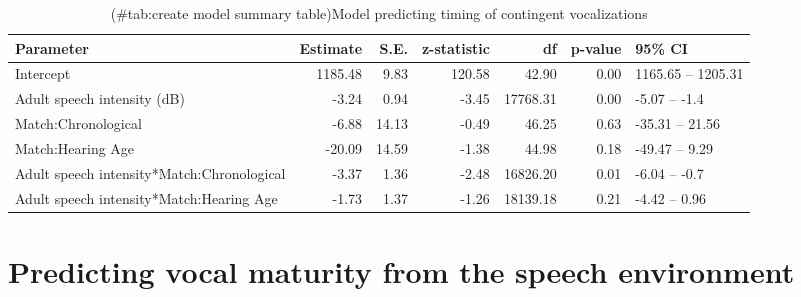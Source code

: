 \documentclass[
]{article}
\begin{document}
\begin{landscape}\begin{table}

\caption{(\#tab:create model summary table)Model predicting timing of contingent vocalizations}
\centering
\begin{tabular}[t]{lrrrrrl}
\toprule
Parameter & Estimate & S.E. & z-statistic & df & p-value & 95\% CI\\
\midrule
Intercept & 1185.48 & 9.83 & 120.58 & 42.90 & 0.00 & 1165.65 – 1205.31\\
Adult speech intensity (dB) & -3.24 & 0.94 & -3.45 & 17768.31 & 0.00 & -5.07 – -1.4\\
Match:Chronological & -6.88 & 14.13 & -0.49 & 46.25 & 0.63 & -35.31 – 21.56\\
Match:Hearing Age & -20.09 & 14.59 & -1.38 & 44.98 & 0.18 & -49.47 – 9.29\\
Adult speech intensity*Match:Chronological & -3.37 & 1.36 & -2.48 & 16826.20 & 0.01 & -6.04 – -0.7\\
\addlinespace
Adult speech intensity*Match:Hearing Age & -1.73 & 1.37 & -1.26 & 18139.18 & 0.21 & -4.42 – 0.96\\
\bottomrule
\end{tabular}
\end{table}
\end{landscape}

\hypertarget{predicting-vocal-maturity-from-the-speech-environment}{%
\section{Predicting vocal maturity from the speech environment}\label{predicting-vocal-maturity-from-the-speech-environment}}
\end{document}
